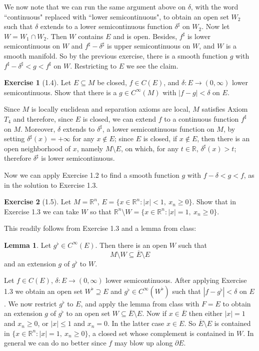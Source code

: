 \documentclass[10pt]{article}
\newcommand{\RR}{\mathbb{R}}
\theoremstyle{definition}
\newtheorem{exer}{Exercise}
\newtheorem{lemma}{Lemma}[exer]
\begin{document}
We now note that we can run the same argument above on $\delta$, with the word ``continuous" replaced with ``lower semicontinuous", to obtain an open set $W_2$ such that $\delta$ extends to a lower semicontinuous function $\delta^\sharp$ on $W_2$.
Now let $W = W_1 \cap W_2$. Then $W$ contains $E$ and is open.
Besides, $f^\sharp$ is lower semicontinuous on $W$ and $f^\sharp - \delta^\sharp$ is upper semicontinuous on $W$, and $W$ is a smooth manifold.
So by the previous exercise, there is a smooth function $g$ with $f^\sharp - \delta^\sharp < g < f^\sharp$ on $W$.
Restricting to $E$ we see the claim.

\begin{exer}[1.4]
Let $E \subseteq M$ be closed, $f \in C(E)$, and $\delta: E \to (0, \infty)$ lower semicontinuous. Show that there is a $g \in C^\infty(M)$ with $|f - g| < \delta$ on $E$.
\end{exer}

Since $M$ is locally euclidean and separation axioms are local, $M$ satisfies Axiom $T_4$ and therefore, since $E$ is closed, we can extend $f$ to a continuous function $f^\sharp$ on $M$.
Moreover, $\delta$ extends to $\delta^\sharp$, a lower semicontinuous function on $M$, by setting $\delta^\sharp(x) = +\infty$ for any $x \notin E$; since $E$ is closed, if $x \notin E$, then there is an open neighborhood of $x$, namely $M \setminus E$, on which, for any $t \in \RR$, $\delta^\sharp(x) > t$; therefore $\delta^\sharp$ is lower semicontinuous.

Now we can apply Exercise 1.2 to find a smooth function $g$ with $f - \delta < g < f$, as in the solution to Exercise 1.3.

\begin{exer}[1.5]
Let $M = \RR^n$, $E = \{x \in \RR^n: |x| < 1,~x_n \geq 0\}$. Show that in Exercise 1.3 we can take $W$ so that $\RR^n \setminus W = \{x \in \RR^n: |x| = 1,~x_n \geq 0\}$.
\end{exer}

This readily follows from Exercise 1.3 and a lemma from class:

\begin{lemma}
Let $g^\flat \in C^\infty(E)$. Then there is an open $W$ such that
$$M \setminus W \subseteq \overline E \setminus E$$
and an extension $g$ of $g^\flat$ to $W$.
\end{lemma}

Let $f \in C(E)$, $\delta: E \to (0, \infty)$ lower semicontinuous.
After applying Exercise 1.3 we obtain an open set $W^\flat \supseteq E$ and $g^\flat \in C^\infty(W^\flat)$ such that $|f - g^\flat| < \delta$ on $E$.
We now restrict $g^\flat$ to $E$, and apply the lemma from class with $F = E$ to obtain an extension $g$ of $g^\flat$ to an open set $W \subseteq \overline E \setminus E$.
Now if $x \in \overline E$ then either $|x| = 1$ and $x_n \geq 0$, or $|x| \leq 1$ and $x_n = 0$.
In the latter case $x \in E$. So $\overline E \setminus E$ is contained in $\{x \in \RR^n: |x| = 1, ~x_n \geq 0\}$, a closed set whose complement is contained in $W$.
In general we can do no better since $f$ may blow up along $\partial E$.
\end{document}
